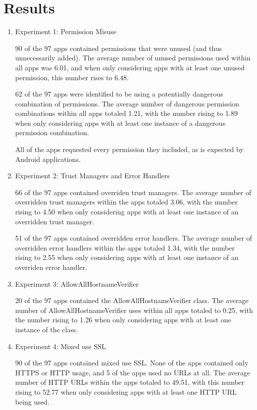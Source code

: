 \section{Results}
\label{sec:discussion}

\begin{enumerate}
    \item Experiment 1: Permission Misuse
    
    90 of the 97 apps contained permissions that were 
    unused (and thus unnecessarily added). The average number 
    of unused permissions used within all apps was 6.01, 
    and when only considering apps with at least one 
    unused permission, this number rises to 6.48.

    62 of the 97 apps were identified to be using a potentially dangerous
    combination of permissions. The average number of dangerous permission
    combinations within all apps totaled 1.21, with the number
    rising to 1.89 when only considering apps with at least one
    instance of a dangerous permission combination.

    All of the apps requested every permission they included, as is expected by Android applications. 

    \item Experiment 2: Trust Managers and Error Handlers
    
    66 of the 97 apps contained overriden trust managers.
    The average number of overridden trust managers within the 
    apps totaled 3.06, with the number rising to 4.50 when only 
    considering apps with at least one instance of an overridden trust 
    manager.

    51 of the 97 apps contained overridden error handlers.
    The average number of overridden error handlers within the apps
    totaled 1.34, with the number rising to 2.55 when only considering apps
    with at least one instance of an overriden error handler.

    \item Experiment 3: AllowAllHostnameVerifier
    
    20 of the 97 apps contained the AllowAllHostnameVerifier class. 
    The average number of AllowAllHostnameVerifier uses within all
    apps totaled to 0.25, with the number rising to 1.26 when only
    considering apps with at least one instance of the class.

    \item Experiment 4: Mixed use SSL
    
    90 of the 97 apps contained mixed use SSL. None of the apps 
    contained only HTTPS or HTTP usage, and 5 of the apps used no 
    URLs at all. The average number of HTTP URLs within the apps 
    totaled to 49.51, with this number rising to 52.77 when only 
    considering apps with at least one HTTP URL being used.


\end{enumerate}

